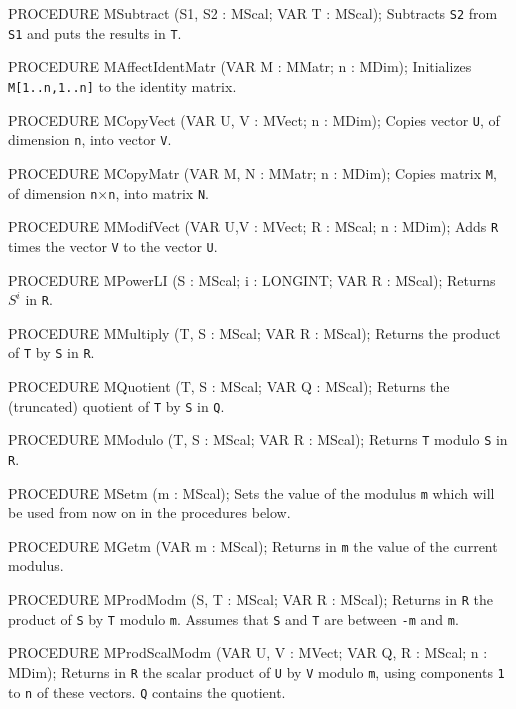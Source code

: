 PROCEDURE MSubtract (S1, S2 : MScal;   VAR T : MScal);
\endcode
  \tab  Subtracts {\tt S2} from {\tt S1} and puts the results in {\tt T}.\endtab
\code

PROCEDURE MAffectIdentMatr (VAR M : MMatr;  n : MDim);
\endcode
  \tab  Initializes {\tt M[1..n,1..n]} to the identity matrix.\endtab
\code

PROCEDURE MCopyVect (VAR U, V : MVect;  n : MDim);
\endcode
  \tab  Copies vector {\tt U}, of dimension {\tt n}, into vector {\tt V}.
  \endtab
\code

PROCEDURE MCopyMatr (VAR M, N : MMatr;   n : MDim);
\endcode
  \tab  Copies matrix {\tt M}, of dimension {\tt n$\times$n}, into matrix {\tt N}.
  \endtab
\code

PROCEDURE MModifVect (VAR U,V : MVect;   R : MScal; n : MDim);
\endcode
  \tab  Adds {\tt R} times the vector {\tt V} to the vector {\tt U}.
  \endtab
\code

PROCEDURE MPowerLI (S : MScal;  i : LONGINT;  VAR R : MScal);
\endcode
   \tab  Returns $S^i$ in {\tt R}. \endtab
\code

PROCEDURE MMultiply (T, S : MScal;   VAR R : MScal);
\endcode
   \tab  Returns the product of {\tt T} by {\tt S} in {\tt R}.
   \endtab
\code

PROCEDURE MQuotient (T, S : MScal;   VAR Q : MScal);
\endcode
   \tab  Returns the (truncated) quotient of {\tt T} by {\tt S} in {\tt Q}.
   \endtab
\code

PROCEDURE MModulo (T, S : MScal;   VAR R : MScal);
\endcode
   \tab  Returns {\tt T} modulo {\tt S} in {\tt R}.
   \endtab
\code

PROCEDURE MSetm (m : MScal);
\endcode
  \tab  Sets the value of the modulus {\tt m} which will be used from now on
  in the procedures below.\endtab
\code

PROCEDURE MGetm (VAR m : MScal);
\endcode
  \tab  Returns in {\tt m} the value of the current modulus.\endtab
\code

PROCEDURE MProdModm (S, T : MScal;  VAR R : MScal);
\endcode
   \tab Returns in {\tt R} the product of {\tt S} by {\tt T} modulo {\tt m}.
    Assumes that {\tt S} and {\tt T} are between {\tt -m} and {\tt m}.
    \endtab
\code

PROCEDURE MProdScalModm (VAR U, V : MVect;   VAR Q, R : MScal;   n : MDim);
\endcode
   \tab Returns in {\tt R} the scalar product of {\tt U} by {\tt V}
    modulo {\tt m}, using components {\tt 1}
    to {\tt n} of these vectors.  {\tt Q} contains the quotient.\endtab
\code

